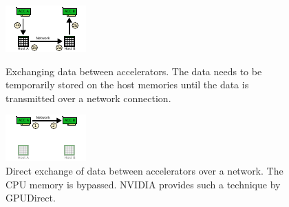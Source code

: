 \begin{figure}[H]
  \begin{minipage}[t]{0.5\textwidth} 
    \includegraphics[width=\textwidth]{graphics/60_acc_memcpy}
    \caption{Exchanging data between accelerators. The data needs to be
    temporarily stored on the host memories until the data is
    transmitted over a network connection.}
    \label{fig:acc_memcpy}
  \end{minipage}%
  \begin{minipage}[t]{0.5\textwidth}
    \includegraphics[width=\textwidth]{graphics/60_gpudirect}
    \caption{Direct exchange of data between accelerators over
      a network. The CPU memory is bypassed. NVIDIA provides such a
      technique by GPUDirect.}
    \label{fig:gpudirect}
  \end{minipage}%

\end{figure}


